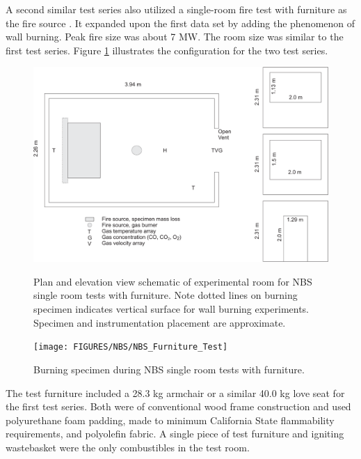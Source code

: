 A second similar test series also utilized a single-room fire test with furniture as the fire source \cite{Lee:1985}. It expanded upon the first data set by adding the phenomenon of wall burning. Peak fire size was about 7 MW. The room size was similar to the first test series. Figure \ref{fig:NBSFurniture} illustrates the configuration for the two test series.

\begin{figure}[\figoptions{b}]
\begin{center}
\includegraphics[width=5.0in]{FIGURES/NBS/NBSFurniture}\\
\end{center}
\caption[Plan and elevation view schematic of experimental room for NBS single room tests with furniture.]{Plan and elevation view schematic of experimental room for NBS single room tests with furniture. Note dotted lines on burning specimen indicates vertical surface for wall burning experiments.  Specimen and instrumentation placement are approximate.}
 \label{fig:NBSFurniture}
\end{figure}

\begin{figure}[\figoptions{b}]
\begin{center}
\texttt{[image: FIGURES/NBS/NBS\_Furniture\_Test]}\\
\end{center}
\caption[Burning specimen during NBS single room tests with furniture.]{Burning specimen during NBS single room tests with furniture.}
 \label{fig:NBSFurniturePix}
\end{figure}

The test furniture included a 28.3 kg armchair or a similar 40.0 kg love seat for the first test series. Both were of conventional wood frame construction and used polyurethane foam padding, made to minimum California State flammability requirements, and polyolefin fabric. A single piece of test furniture and igniting wastebasket were the only combustibles in the test room. 

